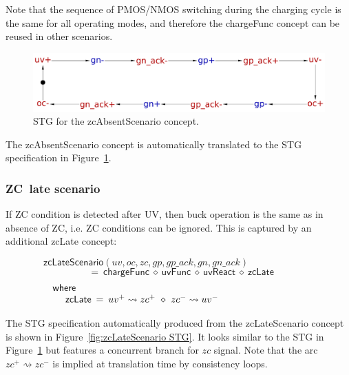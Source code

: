 \documentclass[british, journal]{IEEEtran}
\begin{document}
Note that the sequence of PMOS/NMOS switching during the charging cycle is the
same
for all operating modes, and therefore the \textsf{chargeFunc} concept can be
reused
in other scenarios.

\begin{figure}[H]
\vspace{-3mm}
\begin{centering}
\includegraphics[scale=0.23]{Images/stg-UV_without_ZC}
\par\end{centering}
\protect\caption{\label{fig:zcAbsentScenario STG} STG for the
\textsf{zcAbsentScenario} concept.}
\end{figure}

The \textsf{zcAbsentScenario} concept is automatically translated to the STG
specification
in Figure~\ref{fig:zcAbsentScenario STG}.

\subsubsection{ZC~late scenario}


If ZC condition is detected after UV, then buck operation is the same as in
absence of ZC, i.e. ZC conditions can be ignored. This is captured by an
additional
\textsf{zcLate} concept:

\vspace{-4mm}
\[
\mathsf{zcLateScenario}(uv,oc,zc,gp,gp\_ack,gn,gn\_ack)~~~~~~~~~~~~~~~~~~~~~~~~~~~~~~~
\]
\vspace{-6mm}
\[
~~=~\mathsf{chargeFunc}~\diamond~\mathsf{uvFunc}~\diamond~\mathsf{uvReact}~\diamond~\mathsf{zcLate}
\]
\vspace{-5mm}
\[
\begin{array}{lcl}
\mathsf{where}&~&\\

~~~~\mathsf{zcLate}&\hspace{-2mm}=&\hspace{-2mm}uv^{+}\rightsquigarrow
zc^{+}~\diamond~ zc^{-}\rightsquigarrow uv^{-}~~~~~~~~~~~~~~~~~~~~~~~~~~~

\end{array}
\]

The STG specification automatically produced from the \textsf{zcLateScenario}
concept
is shown in Figure~\ref{fig:zcLateScenario STG}. It looks similar to the STG in
Figure~\ref{fig:zcAbsentScenario STG} but features a concurrent branch for $zc$
signal.
Note that the arc $zc^{+}\rightsquigarrow zc^{-}$ is implied at translation
time by consistency loops.
\end{document}
